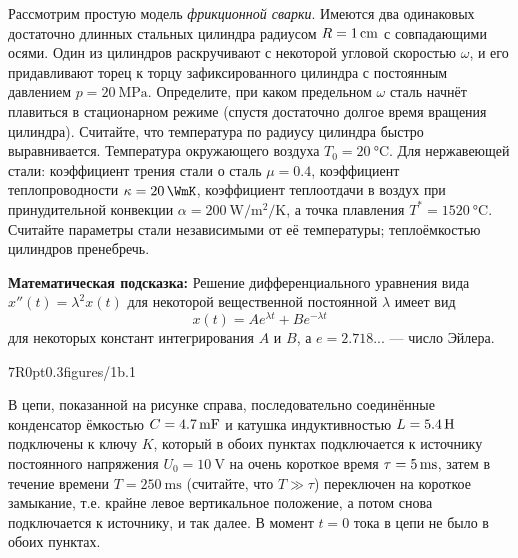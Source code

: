 \problemsheader


\centerline{}


Рассмотрим простую модель \textit{фрикционной сварки}. Имеются два одинаковых достаточно длинных стальных цилиндра радиусом $R=\qty1{\cm}$ с совпадающими осями. Один из цилиндров раскручивают с некоторой угловой скоростью $\omega$, и его придавливают торец к торцу зафиксированного цилиндра с постоянным давлением $p=\qty{20}{\MPa}$. Определите, при каком предельном $\omega$ сталь начнёт плавиться в стационарном режиме (спустя достаточно долгое время вращения цилиндра). Считайте, что температура по радиусу цилиндра быстро выравнивается. Температура окружающего воздуха $T_0=\qty{20}{\celsius}$. Для нержавеющей стали: коэффициент трения стали о сталь $\mu=0.4$, коэффициент теплопроводности $\kappa=\qty{20}{\WmK}$, коэффициент теплоотдачи в воздух при принудительной конвекции $\alpha=\qty{200}{\W\per\metre\squared\per\kelvin}$, а точка плавления $T^*=\qty{1520}{\celsius}$. Считайте параметры стали независимыми от её температуры; теплоёмкостью цилиндров пренебречь.

\textbf{Математическая подсказка:} Решение дифференциального уравнения вида $x''(t) = \lambda^2 x(t)$ для некоторой вещественной постоянной $\lambda$ имеет вид
$$
x(t) = Ae^{\lambda t} + Be^{-\lambda t}
$$
для некоторых констант интегрирования $A$ и $B$, а $e=2.718...$ --- число Эйлера.


\pic7R{0pt}{0.3}{figures/1b.1}

В цепи, показанной на рисунке справа, последовательно соединённые конденсатор ёмкостью $C=\qty{4.7}{\mF}$ и катушка индуктивностью $L=\qty{5.4}{\H}$ подключены к ключу $K$, который в обоих пунктах подключается к источнику постоянного напряжения $U_0=\qty{10}{\V}$ на очень короткое время $\tau=\qty5{\ms}$, затем в течение времени $T=\qty{250}{\ms}$ (считайте, что $T\gg\tau$) переключен на короткое замыкание, т.е. крайне левое вертикальное положение, а потом снова подключается к источнику, и так далее. В момент $t=0$ тока в цепи не было в обоих пунктах.

